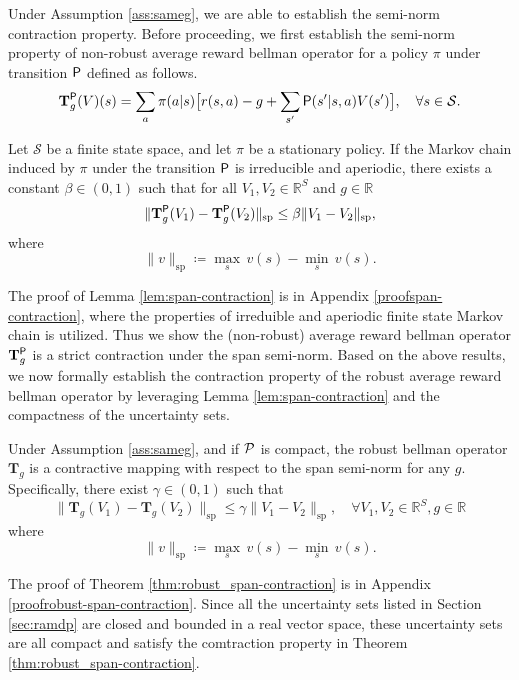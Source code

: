 Under Assumption \ref{ass:sameg}, we are able to establish the semi-norm contraction property. Before proceeding, we first establish the semi-norm property of non-robust average reward bellman operator for a policy $\pi$ under transition $\mathsf P$ defined as follows.
\begin{equation} \label{eq:bellmanoperator_nonrobust}
    \mathbf{T}_g^{\mathsf P}(V)(s) = \sum_{a} \pi(a|s) \big[ r(s,a) - g +  \sum_{s'} \mathsf P(s'|s,a)V(s')\big], \quad \forall s \in \mathcal{S}.
\end{equation}


\begin{lemma} \label{lem:span-contraction}
Let $\mathcal{S}$ be a finite state space, and let $\pi$ be a stationary policy. If the Markov chain induced by $\pi$ under the transition $\mathsf P$ is irreducible and aperiodic, there exists a constant $\beta \in (0,1)$ such that for all $V_1, V_2 \in \mathbb{R}^S$ and $g \in \mathbb{R}$
\begin{equation}
\| \mathbf{T}_g^{\mathsf P}(V_1) -  \mathbf{T}_g^{\mathsf P}(V_2)\|_{\mathrm{sp}} \leq \beta \|V_1 - V_2\|_{\mathrm{sp}},
\end{equation}
where
$$
\|v\|_{\mathrm{sp}} \coloneqq \max_{s}\,v(s) - \min_{s}\,v(s).
$$
\end{lemma}
The proof of Lemma \ref{lem:span-contraction} is in Appendix \ref{proofspan-contraction}, where the  properties of irreduible and aperiodic finite state Markov chain is utilized.  Thus we show the (non-robust) average reward bellman operator $\mathbf{T}_g^{\mathsf P}$ is a strict contraction under the span semi-norm. Based on the above results, we now formally establish the contraction property of the robust average reward bellman operator by leveraging Lemma \ref{lem:span-contraction} and the compactness of the uncertainty sets.



\begin{theorem} \label{thm:robust_span-contraction}
     Under Assumption \ref{ass:sameg}, and if $\mathcal{P}$ is compact, the robust bellman operator $\mathbf{T}_g$ is a contractive mapping with respect to the span semi-norm for any $g$. Specifically, there exist $\gamma \in (0,1)$ such that
\begin{equation} \label{eq:contractiongamma}
\| \mathbf{T}_g(V_1) -  \mathbf{T}_g(V_2)\|_{\mathrm{sp}} \leq \gamma \|V_1 - V_2\|_{\mathrm{sp}}, \quad \forall V_1, V_2 \in \mathbb{R}^S, g\in \mathbb{R}
\end{equation}
where
$$
\|v\|_{\mathrm{sp}} \coloneqq \max_{s}\,v(s) - \min_{s}\,v(s). 
$$
\end{theorem}
The proof of Theorem \ref{thm:robust_span-contraction} is in Appendix \ref{proofrobust-span-contraction}. 
 Since all the uncertainty sets listed in Section \ref{sec:ramdp} are closed and bounded in a real vector space, these uncertainty sets are all compact and satisfy the comtraction property in Theorem \ref{thm:robust_span-contraction}.
